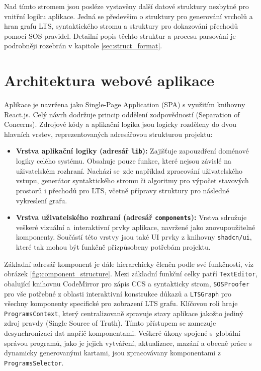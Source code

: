 Nad tímto stromem jsou posléze vystavěny další datové struktury nezbytné pro vnitřní logiku aplikace. 
Jedná se především o struktury pro generování vrcholů a hran grafu LTS, syntaktického stromu a struktury pro dokazování přechodů pomocí SOS pravidel. 
Detailní popis těchto struktur a procesu parsování je podrobněji rozebrán v kapitole \ref{sec:struct_format}.

\section{Architektura webové aplikace}
\label{sec:web_app_architecture}
Aplikace je navržena jako Single-Page Application (SPA) s využitím knihovny React.js. 
Celý návrh dodržuje princip oddělení zodpovědností (Separation of Concerns). 
Zdrojové kódy a aplikační logika jsou logicky rozděleny do dvou hlavních vrstev, reprezentovaných adresářovou strukturou projektu:
\begin{itemize}
    \item \textbf{Vrstva aplikační logiky (adresář \texttt{lib}):} 
    Zajišťuje zapouzdření doménové logiky celého systému. 
    Obsahuje pouze funkce, které nejsou závislé na uživatelském rozhraní. 
    Nachází se~zde například zpracování uživatelského vstupu, generátor syntaktického stromu či algoritmy pro výpočet stavových prostorů i přechodů pro LTS, včetně přípravy struktury pro následné vykreslení grafu.
    \item \textbf{Vrstva uživatelského rozhraní (adresář \texttt{components}):} 
    Vrstva sdružuje veškeré vizuální a~interaktivní prvky aplikace, navržené jako znovupoužitelné komponenty.
    Součástí této vrstvy jsou také UI prvky z knihovny \texttt{shadcn/ui}, které tak mohou být funkčně přizpůsobeny potřebám projektu.
\end{itemize}

Základní adresář komponent je dále hierarchicky členěn podle své funkčnosti, viz obrázek \ref{fig:component_structure}. 
Mezi základní funkční celky patří \texttt{TextEditor}, obalující knihovnu CodeMirror pro zápis CCS a syntakticky strom, \texttt{SOSProofer} pro vše potřebné z oblasti interaktivní konstrukce důkazů a \texttt{LTSGraph} pro všechny komponenty specifické pro zobrazení LTS grafu. 
Klíčovou roli hraje \texttt{ProgramsContext}, který centralizovaně spravuje stavy aplikace jakožto jediný zdroj pravdy (Single Source of Truth). Tímto přístupem se zamezuje desynchronizaci dat napříč komponentami.
Veškeré úkony spojené s~globální správou programů, jako je jejich vytváření, aktualizace, mazání a obecně práce s dynamicky generovanými kartami, jsou zpracovávany komponentami z \texttt{ProgramsSelector}.

